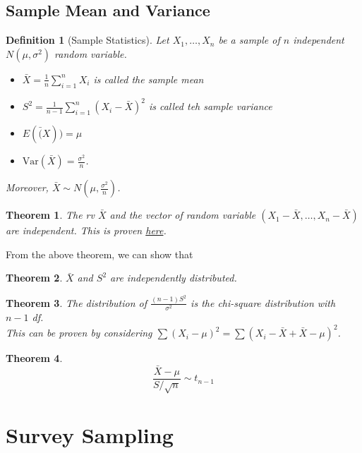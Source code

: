 \documentclass[12pt]{article}
\newcommand{\var}{\mathrm{Var}}
\newtheorem{definition}{Definition}[section]
\newtheorem{theorem}{Theorem}[section]
\theoremstyle{definition}
\begin{document}
\subsection{Sample Mean and Variance}
\begin{definition}[Sample Statistics]
\normalfont Let $X_1,\ldots, X_n$ be a sample of $n$ independent $N(\mu,\sigma^2)$ random variable.
\begin{itemize}
  \item $\bar{X}=\frac{1}{n}\sum_{i=1}^n X_i$ is called the sample mean
  \item $S^2 = \frac{1}{n-1} \sum_{i=1}^n (X_i-\bar{X})^2$ is called teh sample variance
  \item $E(\bar(X)) = \mu$
  \item $\var(\bar{X}) = \frac{\sigma^2}{n}$. 
\end{itemize}
Moreover, $\bar{X}\sim N(\mu, \frac{\sigma^2}{n})$.
\end{definition}
\begin{theorem}
\normalfont The rv $\bar{X}$ and the vector of random variable $(X_1-\bar{X},\ldots, X_n-\bar{X})$ are independent. This is proven \href{https://www.stat.nus.edu.sg/~stalohwl/lecture2.pdf}{here}.
\end{theorem}
From the above theorem, we can show that 
\begin{theorem}
\normalfont $\bar{X}$ and $S^2$ are independently distributed.
\end{theorem}
\begin{theorem}
\normalfont The distribution of $\frac{(n-1)S^2}{\sigma^2}$ is the chi-square distribution with $n-1$ df. \\This can be proven by considering $\sum(X_i-\mu)^2 = \sum(X_i-\bar{X}+\bar{X}-\mu)^2$.
\end{theorem}
\begin{theorem}
\[
\frac{\bar{X}-\mu}{S/\sqrt{n}}\sim t_{n-1}
\]
\end{theorem}
\section{Survey Sampling}
\end{document}

